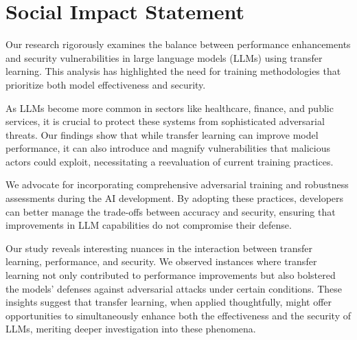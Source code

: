 \documentclass{article}
\begin{document}
\vspace{50pt}




% 
% 

\appendix

\section{Social Impact Statement}\label{app: social statement}

Our research rigorously examines the balance between performance enhancements and security vulnerabilities in large language models (LLMs) using transfer learning. This analysis has highlighted the need for training methodologies that prioritize both model effectiveness and security.

As LLMs become more common in sectors like healthcare, finance, and public services, it is crucial to protect these systems from sophisticated adversarial threats. Our findings show that while transfer learning can improve model performance, it can also introduce and magnify vulnerabilities that malicious actors could exploit, necessitating a reevaluation of current training practices.

We advocate for incorporating comprehensive adversarial training and robustness assessments during the AI development. By adopting these practices, developers can better manage the trade-offs between accuracy and security, ensuring that improvements in LLM capabilities do not compromise their defense.

Our study reveals interesting nuances in the interaction between transfer learning, performance, and security. We observed instances where transfer learning not only contributed to performance improvements but also bolstered the models' defenses against adversarial attacks under certain conditions. These insights suggest that transfer learning, when applied thoughtfully, might offer opportunities to simultaneously enhance both the effectiveness and the security of LLMs, meriting deeper investigation into these phenomena.

\end{document}
